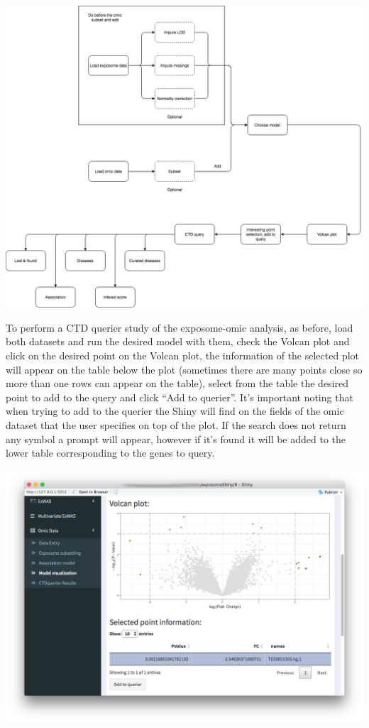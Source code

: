 \documentclass[
]{book}
\begin{document}
\includegraphics{images/analysis10_1.png}

To perform a CTD querier study of the exposome-omic analysis, as before, load both datasets and run the desired model with them, check the Volcan plot and click on the desired point on the Volcan plot, the information of the selected plot will appear on the table below the plot (sometimes there are many points close so more than one rows can appear on the table), select from the table the desired point to add to the query and click ``Add to querier''. It's important noting that when trying to add to the querier the Shiny will find on the fields of the omic dataset that the user specifies on top of the plot. If the search does not return any symbol a prompt will appear, however if it's found it will be added to the lower table corresponding to the genes to query.

\includegraphics{images/analysis10_2.png}
\end{document}

